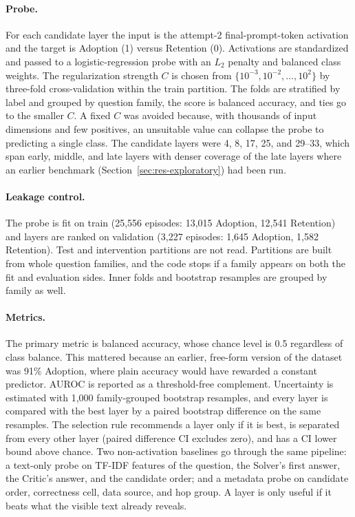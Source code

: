 \paragraph{Probe.} For each candidate layer the input is the attempt-2
final-prompt-token activation and the target is Adoption (1) versus Retention
(0). Activations are standardized and passed to a logistic-regression probe
with an $L_2$ penalty and balanced class weights. The regularization strength
$C$ is chosen from $\{10^{-3},10^{-2},\dots,10^{2}\}$ by three-fold
cross-validation within the train partition. The folds are stratified by label
and grouped by question family, the score is balanced accuracy, and ties go to
the smaller $C$. A fixed $C$ was avoided because, with thousands of input
dimensions and few positives, an unsuitable value can collapse the probe to
predicting a single class. The candidate layers were 4, 8, 17, 25, and 29--33,
which span early, middle, and late layers with denser coverage of the late
layers where an earlier benchmark (Section~\ref{sec:res-exploratory}) had been
run.

\paragraph{Leakage control.} The probe is fit on train (25,556 episodes:
13,015 Adoption, 12,541 Retention) and layers are ranked on validation (3,227
episodes: 1,645 Adoption, 1,582 Retention). Test and intervention partitions
are not read. Partitions are built from whole question families, and the code
stops if a family appears on both the fit and evaluation sides. Inner folds
and bootstrap resamples are grouped by family as well.

\paragraph{Metrics.} The primary metric is balanced accuracy, whose chance
level is 0.5 regardless of class balance. This mattered because an earlier,
free-form version of the dataset was 91\% Adoption, where plain accuracy would
have rewarded a constant predictor. AUROC is reported as a threshold-free
complement. Uncertainty is estimated with 1,000 family-grouped bootstrap
resamples, and every layer is compared with the best layer by a paired
bootstrap difference on the same resamples. The selection rule recommends a
layer only if it is best, is separated from every other layer (paired
difference CI excludes zero), and has a CI lower bound above chance. Two
non-activation baselines go through the same pipeline: a text-only probe on
TF-IDF features of the question, the Solver's first answer, the Critic's
answer, and the candidate order; and a metadata probe on candidate order,
correctness cell, data source, and hop group. A layer is only useful if it
beats what the visible text already reveals.

